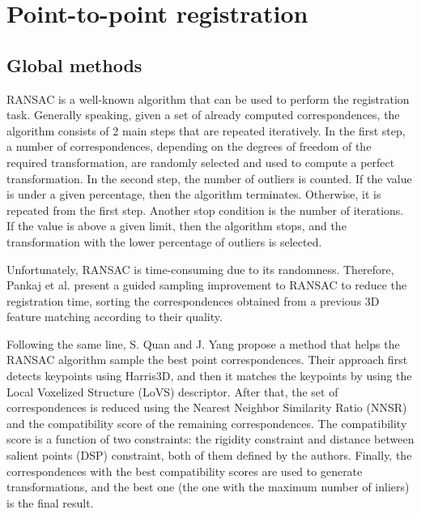     \section{Point-to-point registration}
        \subsection{Global methods}

        RANSAC \cite{Fischler_1981_RANSAC} is a well-known algorithm that can be used to perform the registration task. 
        Generally speaking, given a set of already computed correspondences, the algorithm consists of 2 main steps that are repeated iteratively. 
        In the first step, a number of correspondences, depending on the degrees of freedom of the required transformation, 
        are randomly selected and used to compute a perfect transformation. 
        In the second step, the number of outliers is counted. 
        If the value is under a given percentage, then the algorithm terminates. Otherwise, it is repeated from the first step. 
        Another stop condition is the number of iterations. 
        If the value is above a given limit, then the algorithm stops, and the transformation with the lower percentage of outliers is selected.
        
        Unfortunately, RANSAC is time-consuming due to its randomness.
        Therefore, Pankaj et al. \cite{Pankaj_2015_arobust} present a guided sampling improvement to RANSAC
        to reduce the registration time, sorting the correspondences obtained from a previous 3D feature matching according to their quality.
        
        Following the same line, S. Quan and J. Yang \cite{Quan_2020_com} propose a method that helps the RANSAC algorithm 
        sample the best point correspondences. Their approach first detects keypoints using Harris3D, and then it matches the keypoints
        by using the Local Voxelized Structure (LoVS) descriptor. 
        After that, the set of correspondences is reduced using the Nearest Neighbor Similarity Ratio (NNSR) and the compatibility score of the remaining correspondences. 
        The compatibility score is a function of two constraints: the rigidity constraint and distance between salient points (DSP) constraint, 
        both of them defined by the authors.
        Finally, the correspondences with the best compatibility scores are used to generate transformations,
        and the best one (the one with the maximum number of inliers) is the final result.

